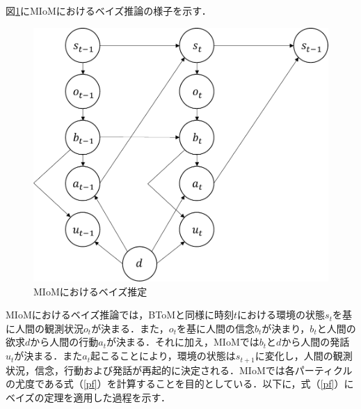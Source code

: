 \par
図\ref{fig:miom}にMIoMにおけるベイズ推論の様子を示す．
\begin{figure}[htbp]
  \begin{center}
    \includegraphics[scale=0.85]{./miom.pdf}
    \caption{MIoMにおけるベイズ推定}
    \label{fig:miom}
  \end{center}
\end{figure}
MIoMにおけるベイズ推論では，BToMと同様に時刻$t$における環境の状態$s_{t}$を基に人間の観測状況$o_{t}$が決まる．また，$o_{t}$を基に人間の信念$b_{t}$が決まり，$b_{t}$と人間の欲求$d$から人間の行動$a_{t}$が決まる．それに加え，MIoMでは$b_t$と$d$から人間の発話$u_t$が決まる．また$a_{t}$起こることにより，環境の状態は$s_{t+1}$に変化し，人間の観測状況，信念，行動および発話が再起的に決定される．MIoMでは各パーティクルの尤度である式（\ref{pf}）を計算することを目的としている．以下に，式（\ref{pf}）にベイズの定理を適用した過程を示す．

